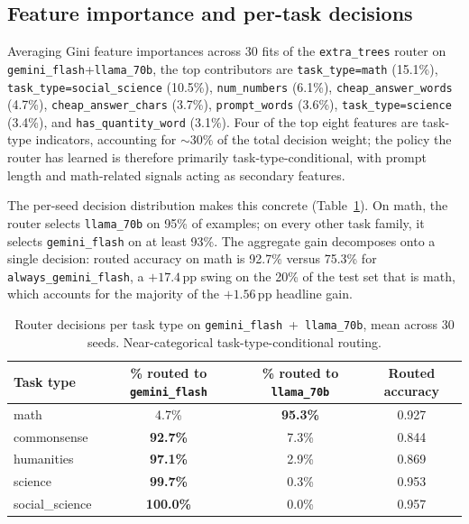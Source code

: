\documentclass[11pt]{article}
\begin{document}
\subsection{Feature importance and per-task decisions}
\label{sec:fi}
Averaging Gini feature importances across 30 fits of the \texttt{extra\_trees} router on \texttt{gemini\_flash}+\texttt{llama\_70b}, the top contributors are \texttt{task\_type=math} (15.1\%), \texttt{task\_type=social\_science} (10.5\%), \texttt{num\_numbers} (6.1\%), \texttt{cheap\_answer\_words} (4.7\%), \texttt{cheap\_answer\_chars} (3.7\%), \texttt{prompt\_words} (3.6\%), \texttt{task\_type=science} (3.4\%), and \texttt{has\_quantity\_word} (3.1\%). Four of the top eight features are task-type indicators, accounting for $\sim 30\%$ of the total decision weight; the policy the router has learned is therefore primarily task-type-conditional, with prompt length and math-related signals acting as secondary features.

The per-seed decision distribution makes this concrete (Table~\ref{tab:routing}). On math, the router selects \texttt{llama\_70b} on 95\% of examples; on every other task family, it selects \texttt{gemini\_flash} on at least 93\%. The aggregate gain decomposes onto a single decision: routed accuracy on math is 92.7\% versus 75.3\% for \texttt{always\_gemini\_flash}, a $+17.4$\,pp swing on the 20\% of the test set that is math, which accounts for the majority of the $+1.56$\,pp headline gain.

\begin{table}[h]
\centering
\small
\begin{tabular}{lccc}
\toprule
Task type & \% routed to \texttt{gemini\_flash} & \% routed to \texttt{llama\_70b} & Routed accuracy \\
\midrule
math            & 4.7\%   & \textbf{95.3\%} & 0.927  \\
commonsense     & \textbf{92.7\%} & 7.3\%    & 0.844  \\
humanities      & \textbf{97.1\%} & 2.9\%    & 0.869  \\
science         & \textbf{99.7\%} & 0.3\%    & 0.953  \\
social\_science & \textbf{100.0\%} & 0.0\%   & 0.957  \\
\bottomrule
\end{tabular}
\caption{Router decisions per task type on \texttt{gemini\_flash}~+~\texttt{llama\_70b}, mean across 30 seeds. Near-categorical task-type-conditional routing.}
\label{tab:routing}
\end{table}
\end{document}
